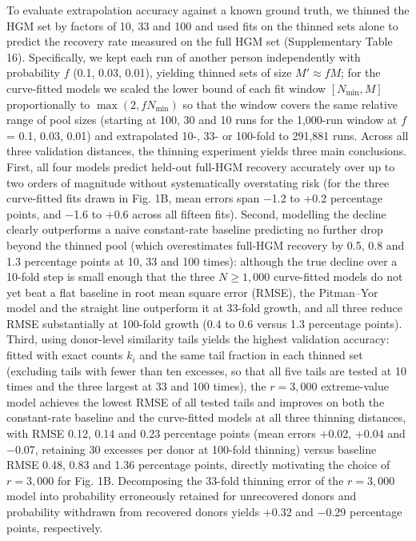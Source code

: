 \documentclass[11pt,a4paper]{article}
\begin{document}
To evaluate extrapolation accuracy against a known ground truth, we thinned the HGM set by factors of 10, 33 and 100 and used fits on the thinned sets alone to predict the recovery rate measured on the full HGM set (Supplementary Table 16). Specifically, we kept each run of another person independently with probability $f$ (0.1, 0.03, 0.01), yielding thinned sets of size $M' \approx f M$; for the curve-fitted models we scaled the lower bound of each fit window $[N_{\min}, M]$ proportionally to $\max(2, f N_{\min})$ so that the window covers the same relative range of pool sizes (starting at 100, 30 and 10 runs for the 1,000-run window at $f$ = 0.1, 0.03, 0.01) and extrapolated 10-, 33- or 100-fold to 291,881 runs. Across all three validation distances, the thinning experiment yields three main conclusions. First, all four models predict held-out full-HGM recovery accurately over up to two orders of magnitude without systematically overstating risk (for the three curve-fitted fits drawn in Fig. 1B, mean errors span $-$1.2 to +0.2 percentage points, and $-$1.6 to +0.6 across all fifteen fits). Second, modelling the decline clearly outperforms a naive constant-rate baseline predicting no further drop beyond the thinned pool (which overestimates full-HGM recovery by 0.5, 0.8 and 1.3 percentage points at 10, 33 and 100 times): although the true decline over a 10-fold step is small enough that the three $N \ge 1{,}000$ curve-fitted models do not yet beat a flat baseline in root mean square error (RMSE), the Pitman--Yor model and the straight line outperform it at 33-fold growth, and all three reduce RMSE substantially at 100-fold growth (0.4 to 0.6 versus 1.3 percentage points). Third, using donor-level similarity tails yields the highest validation accuracy: fitted with exact counts $k_i$ and the same tail fraction in each thinned set (excluding tails with fewer than ten excesses, so that all five tails are tested at 10 times and the three largest at 33 and 100 times), the $r = 3{,}000$ extreme-value model achieves the lowest RMSE of all tested tails and improves on both the constant-rate baseline and the curve-fitted models at all three thinning distances, with RMSE 0.12, 0.14 and 0.23 percentage points (mean errors +0.02, +0.04 and $-$0.07, retaining 30 excesses per donor at 100-fold thinning) versus baseline RMSE 0.48, 0.83 and 1.36 percentage points, directly motivating the choice of $r = 3{,}000$ for Fig. 1B. Decomposing the 33-fold thinning error of the $r = 3{,}000$ model into probability erroneously retained for unrecovered donors and probability withdrawn from recovered donors yields +0.32 and $-$0.29 percentage points, respectively.
\end{document}
